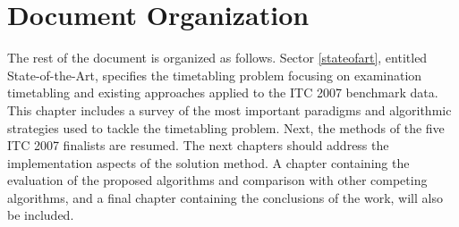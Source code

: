 
\section{Document Organization}

The rest of the document is organized as follows. Sector \ref{stateofart}, entitled State-of-the-Art, specifies the timetabling problem focusing on examination timetabling and existing approaches applied to the ITC 2007 benchmark data. This chapter includes a survey of the most important paradigms and algorithmic strategies used to tackle the timetabling problem. Next, the methods of the five ITC 2007 finalists are resumed. The next chapters should address the implementation aspects of the solution method. A chapter containing the evaluation of the proposed algorithms and comparison with other competing algorithms, and a final chapter containing the conclusions of the work, will also be included.